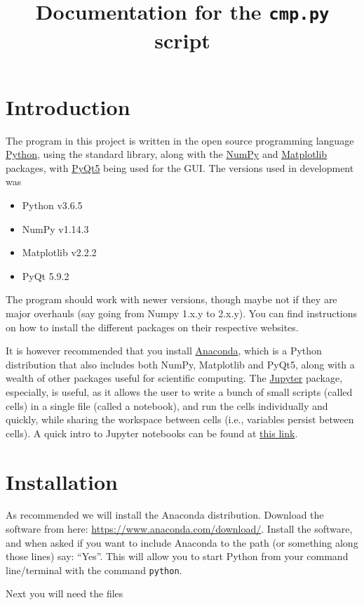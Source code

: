 \documentclass[a4paper,11pt]{article}
\title{Documentation for the \texorpdfstring{\texttt{cmp.py}}{cmp.py} script}
\date{}
\numberwithin{equation}{section}
\begin{document}
	\maketitle
	
	\section{Introduction}
	The program in this project is written in the open source programming language \href{www.python.org}{Python}, using the standard library, along with the \href{www.numpy.org}{NumPy} and \href{www.matplotlib.org}{Matplotlib} packages, with \href{www.pypi.org/project/PyQt5/}{PyQt5} being used for the GUI. The versions used in development was
	\begin{itemize}
		\item Python v3.6.5
		\item NumPy v1.14.3
		\item Matplotlib v2.2.2
		\item PyQt 5.9.2
	\end{itemize}
	The program should work with newer versions, though maybe not if they are major overhauls (say going from Numpy 1.x.y to 2.x.y). You can find instructions on how to install the different packages on their respective websites.
	
	It is however recommended that you install \href{https://www.anaconda.com/}{Anaconda}, which is a Python distribution that also includes both NumPy, Matplotlib and PyQt5, along with a wealth of other packages useful for scientific computing. The \href{http://jupyter.org/}{Jupyter} package, especially, is useful, as it allows the user to write a bunch of small scripts (called cells) in a single file (called a notebook), and run the cells individually and quickly, while sharing the workspace between cells (i.e., variables persist between cells). A quick intro to Jupyter notebooks can be found at \href{http://nbviewer.jupyter.org/github/jupyter/notebook/blob/master/docs/source/examples/Notebook/Notebook Basics.ipynb}{this link}.
	
	\section{Installation}
	As recommended we will install the Anaconda distribution. Download the software from here: \url{https://www.anaconda.com/download/}. Install the software, and when asked if you want to include Anaconda to the path (or something along those lines) say: ``Yes''. This will allow you to start Python from your command line/terminal with the command \texttt{python}.
	
	Next you will need the files 
	
	
\end{document}
